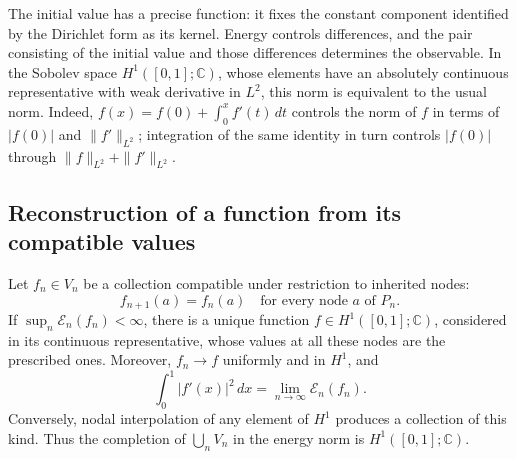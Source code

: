 The initial value has a precise function: it fixes the constant
component identified by the Dirichlet form as its kernel. Energy
controls differences, and the pair consisting of the initial value
and those differences determines the observable. In the Sobolev space
\(H^1([0,1];\mathbb C)\), whose elements have an absolutely continuous
representative with weak derivative in \(L^2\), this norm is equivalent
to the usual norm. Indeed, \(f(x)=f(0)+\int_0^xf'(t)\,dt\)
controls the norm of \(f\) in terms of \(|f(0)|\) and
\(\|f'\|_{L^2}\); integration of the same identity in turn controls
\(|f(0)|\) through \(\|f\|_{L^2}+\|f'\|_{L^2}\).

\subsection{Reconstruction of a function from its compatible values}

\begin{theorem}
\label{thm:limite-energia-h1-k}
Let \(f_n\in V_n\) be a collection compatible under restriction to
inherited nodes:
\[
 f_{n+1}(a)=f_n(a)
 \quad\text{for every node }a\text{ of }P_n.
\]
If \(\sup_n\mathcal E_n(f_n)<\infty\), there is a unique function
\(f\in H^1([0,1];\mathbb C)\), considered in its continuous
representative, whose values at all these nodes are the prescribed
ones. Moreover, \(f_n\to f\) uniformly and in \(H^1\), and
\begin{equation}
 \int_0^1|f'(x)|^2\,dx
 =\lim_{n\to\infty}\mathcal E_n(f_n).
 \label{eq:limite-energia-h1-k}
\end{equation}
Conversely, nodal interpolation of any element of \(H^1\) produces
a collection of this kind. Thus the completion of \(\bigcup_n V_n\)
in the energy norm is \(H^1([0,1];\mathbb C)\).
\end{theorem}

